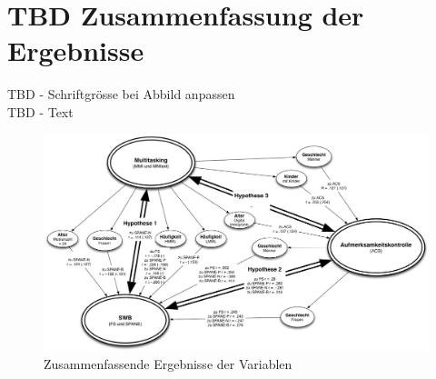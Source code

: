 \section{TBD Zusammenfassung der Ergebnisse}\label{label.ergebnisse.zusammenfassung}
TBD - Schriftgrösse bei Abbild anpassen\\
TBD - Text
\begin{figure}[h]
    \centering
    \includegraphics[scale=0.37]{images/grafiken/Zusammenhang_Zusammenfassung_v1.jpg}
     \caption{Zusammenfassende Ergebnisse der Variablen}
     \label{pic.ergebniss.zusammenfassung}
\end{figure}




